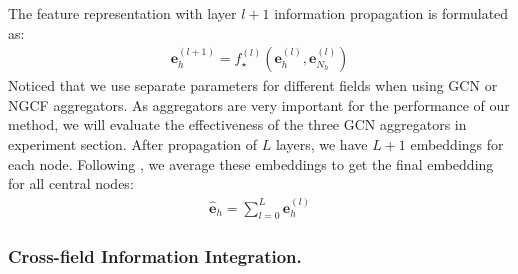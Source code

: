 The feature representation with layer $l+1$ information propagation is formulated as:
\begin{align}
\textbf{e}_h^{(l+1)} = f_{\star}^{(l)}(\textbf{e}_h^{(l)}, \textbf{e}_{N_h}^{(l)})
\end{align}
Noticed that we use separate parameters for different fields when using GCN or NGCF aggregators. As aggregators are very important for the performance of our method, we will evaluate the effectiveness of the three GCN aggregators in experiment section.
After propagation of $L$ layers, we have $L + 1$ embeddings for each node.
Following \cite{he2020lightgcn}, we average these embeddings to get the final embedding for all central nodes:
\begin{align}
\hat{\textbf{e}}_h = \sum_{l=0}^{L}\textbf{e}_h^{(l)}
\end{align}

\subsubsection{Cross-field Information Integration.}

